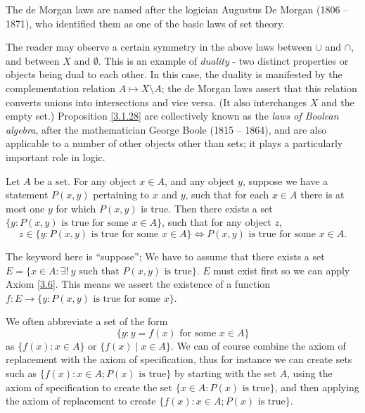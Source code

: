 \begin{remark}\label{3.1.29}
    The de Morgan laws are named after the logician Augustus De Morgan (1806 -- 1871), who identified them as one of the basic laws of set theory.
\end{remark}

\begin{remark}\label{3.1.30}
    The reader may observe a certain symmetry in the above laws between \(\cup\) and \(\cap\), and between \(X\) and \(\emptyset\).
    This is an example of \emph{duality} - two distinct properties or objects being dual to each other.
    In this case, the duality is manifested by the complementation relation \(A \mapsto X \setminus A\);
    the de Morgan laws assert that this relation converts unions into intersections and vice versa.
    (It also interchanges \(X\) and the empty set.)
    Proposition \ref{3.1.28} are collectively known as the \emph{laws of Boolean algebra}, after the mathematician George Boole (1815 -- 1864), and are also applicable to a number of other objects other than sets;
    it plays a particularly important role in logic.
\end{remark}

\begin{axiom}[Replacement]\label{3.6}
    Let \(A\) be a set.
    For any object \(x \in A\), and any object \(y\), suppose we have a statement \(P(x, y)\) pertaining to \(x\) and \(y\), such that for each \(x \in A\) there is at most one \(y\) for which \(P(x, y)\) is true.
    Then there exists a set \(\{y : P(x, y) \text{ is true for some } x \in A\}\), such that for any object \(z\),
    \[
        z \in \{y: P(x, y) \text{ is true for some } x \in A\} \iff P(x, y) \text{ is true for some } x \in A.
    \]
\end{axiom}

\begin{note}
    The keyword here is ``suppose'';
    We have to assume that there exists a set \(E = \{x \in A : \exists!\ y \text{ such that } P(x, y) \text{ is true}\}\).
    \(E\) must exist first so we can apply Axiom \ref{3.6}.
    This means we assert the existence of a function \(f : E \to \{y : P(x, y) \text{ is true for some } x\}\).
\end{note}

\begin{note}
    We often abbreviate a set of the form
    \[
        \{y : y = f(x) \text{ for some } x \in A\}
    \]
    as \(\{f(x) : x \in A\}\) or \(\{f(x) \mid x \in A\}\).
    We can of course combine the axiom of replacement with the axiom of specification, thus for instance we can create sets such as \(\{f(x) : x \in A; P(x) \text{ is true}\}\) by starting with the set \(A\), using the axiom of specification to create the set \(\{x \in A : P(x) \text{ is true}\}\), and then applying the axiom of replacement to create \(\{f(x) : x \in A; P(x) \text{ is true}\}\).
\end{note}

